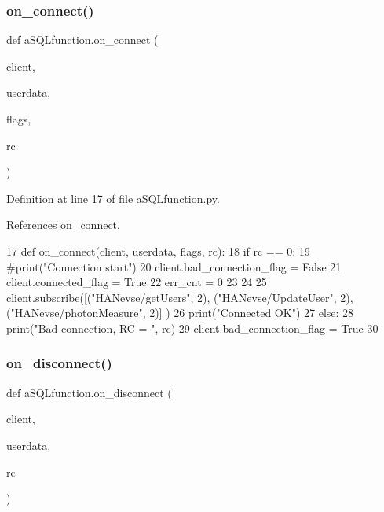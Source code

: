 \subsubsection{on\+\_\+connect()}
{\footnotesize\ttfamily def a\+S\+Q\+Lfunction.\+on\+\_\+connect (\begin{DoxyParamCaption}\item[{}]{client,  }\item[{}]{userdata,  }\item[{}]{flags,  }\item[{}]{rc }\end{DoxyParamCaption})}



Definition at line 17 of file a\+S\+Q\+Lfunction.\+py.



References on\+\_\+connect.


\begin{DoxyCode}
17 \textcolor{keyword}{def }on_connect(client, userdata, flags, rc):
18     \textcolor{keywordflow}{if} rc == 0:
19         \textcolor{comment}{#print("Connection start")}
20         client.bad\_connection\_flag = \textcolor{keyword}{False}
21         client.connected\_flag = \textcolor{keyword}{True}        
22         err\_cnt = 0
23 
24 
25         client.subscribe([(\textcolor{stringliteral}{"HANevse/getUsers"}, 2), (\textcolor{stringliteral}{"HANevse/UpdateUser"}, 2), (\textcolor{stringliteral}{"HANevse/photonMeasure"}, 2)]
      )
26         print(\textcolor{stringliteral}{"Connected OK"})
27     \textcolor{keywordflow}{else}:
28         print(\textcolor{stringliteral}{"Bad connection, RC = "}, rc)
29         client.bad\_connection\_flag = \textcolor{keyword}{True}
30         
\end{DoxyCode}
\mbox{\label{namespacea_s_q_lfunction_a3fedee86aa0e1ebea7003c0e8e622f26}} 
\subsubsection{on\+\_\+disconnect()}
{\footnotesize\ttfamily def a\+S\+Q\+Lfunction.\+on\+\_\+disconnect (\begin{DoxyParamCaption}\item[{}]{client,  }\item[{}]{userdata,  }\item[{}]{rc }\end{DoxyParamCaption})}



